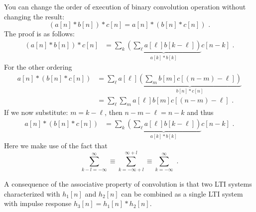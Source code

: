 You can change the order of execution of binary convolution operation without changing the result:
\begin{equation}
(a[n]*b[n])*c[n] = a[n]*(b[n]*c[n])\,\,.
\end{equation}
The proof is as follows:
\begin{align}
(a[n]*b[n])*c[n] &= \sum_{k}\underbrace{\left(\sum_\ell a[\ell]b[k-\ell]\right)}_{a[k]*b[k]} c[n-k]\,\,.
\end{align}
For the other ordering
\begin{align}
a[n]*(b[n]*c[n]) &= \sum_{\ell} a[\ell] \underbrace{\left(\sum_m b[m]c[(n-m)-\ell]\right)}_{b[n]*c[n]}\\
                 &= \sum_{\ell} \sum_m a[\ell] b[m]c[(n-m)-\ell]\,\,.
\end{align}
If we now substitute: $m=k-\ell$, then $n-m-\ell=n-k$ and thus
\begin{align}
a[n]*(b[n]*c[n]) &= \sum_{k} \underbrace{\left(\sum_{\ell} a[\ell] b[k-\ell]\right)}_{a[k]*b[k]} c[n-k]\,\,.
\end{align}
Here we make use of the fact that 
\begin{equation}
\sum_{k-l=-\infty}^{\infty} \equiv \sum_{k=-\infty+l}^{\infty+l} \equiv \sum_{k=-\infty}^{\infty}\,\,. 
\end{equation}


\begin{marginfigure}

\begin{center}
\end{center}
\caption{A consequence of the associative property of convolution is
  that two LTI systems characterized with $h_1[n]$ and $h_2[n]$ can be
  combined as a single LTI system with impulse response
  $h_3[n]=h_1[n]*h_2[n]$.}
\label{fig:cascade_lti}
\end{marginfigure}

